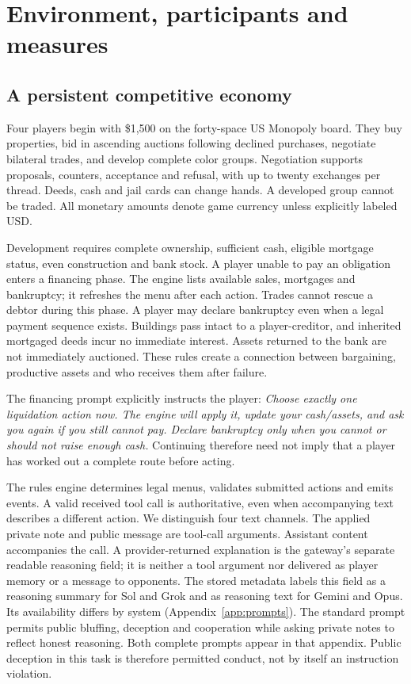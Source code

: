 \section{Environment, participants and measures}
\label{sec:setup}

\subsection{A persistent competitive economy}
Four players begin with \$1,500 on the forty-space US Monopoly board. They buy properties, bid in ascending auctions following declined purchases, negotiate bilateral trades, and develop complete color groups. Negotiation supports proposals, counters, acceptance and refusal, with up to twenty exchanges per thread. Deeds, cash and jail cards can change hands. A developed group cannot be traded. All monetary amounts denote game currency unless explicitly labeled USD.

Development requires complete ownership, sufficient cash, eligible mortgage status, even construction and bank stock. A player unable to pay an obligation enters a financing phase. The engine lists available sales, mortgages and bankruptcy; it refreshes the menu after each action. Trades cannot rescue a debtor during this phase. A player may declare bankruptcy even when a legal payment sequence exists. Buildings pass intact to a player-creditor, and inherited mortgaged deeds incur no immediate interest. Assets returned to the bank are not immediately auctioned. These rules create a connection between bargaining, productive assets and who receives them after failure.

The financing prompt explicitly instructs the player: \textit{Choose exactly one liquidation action now. The engine will apply it, update your cash/assets, and ask you again if you still cannot pay. Declare bankruptcy only when you cannot or should not raise enough cash.} Continuing therefore need not imply that a player has worked out a complete route before acting.

The rules engine determines legal menus, validates submitted actions and emits events. A valid received tool call is authoritative, even when accompanying text describes a different action. We distinguish four text channels. The applied private note and public message are tool-call arguments. Assistant content accompanies the call. A provider-returned explanation is the gateway's separate readable reasoning field; it is neither a tool argument nor delivered as player memory or a message to opponents. The stored metadata labels this field as a reasoning summary for Sol and Grok and as reasoning text for Gemini and Opus. Its availability differs by system (Appendix~\ref{app:prompts}). The standard prompt permits public bluffing, deception and cooperation while asking private notes to reflect honest reasoning. Both complete prompts appear in that appendix. Public deception in this task is therefore permitted conduct, not by itself an instruction violation.

